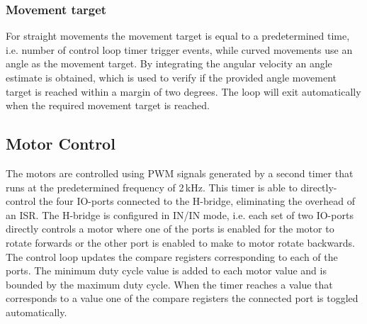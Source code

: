 \subsubsection{Movement target}

For straight movements the movement target is equal to a predetermined time, i.e. number of control loop timer trigger events, while curved movements use an angle as the movement target.
By integrating the angular velocity an angle estimate is obtained, which is used to verify if the provided angle movement target is reached within a margin of two degrees.
The loop will exit automatically when the required movement target is reached.

\subsection{Motor Control}
The motors are controlled using PWM signals generated by a second timer that runs at the predetermined frequency of 2\,kHz.
This timer is able to directly-control the four IO-ports connected to the H-bridge, eliminating the overhead of an ISR.
The H-bridge is configured in IN/IN mode, i.e. each set of two IO-ports directly controls a motor where one of the ports is enabled for the motor to rotate forwards or the other port is enabled to make to motor rotate backwards.
The control loop updates the compare registers corresponding to each of the ports.
The minimum duty cycle value is added to each motor value and is bounded by the maximum duty cycle.
When the timer reaches a value that corresponds to a value one of the compare registers the connected port is toggled automatically.


